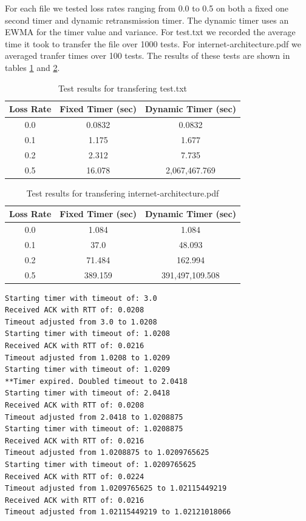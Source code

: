 \documentclass[11pt]{article}
\begin{document}
For each file we tested loss rates ranging from 0.0 to 0.5 on both a fixed one second timer and dynamic retransmission timer. The dynamic timer uses an EWMA for the timer value and variance. For test.txt we recorded the average time it took to transfer the file over 1000 tests. For internet-architecture.pdf we averaged tranfer times over 100 tests. The results of these tests are shown in tables \ref{tbltest} and \ref{tblinternet}.

\begin{table}[H]
\begin{center}
\caption{Test results for transfering test.txt}
\label{tbltest}
\begin{tabular}{ccc}
  \toprule
  Loss Rate & Fixed Timer (sec) & Dynamic Timer (sec) \\
  \midrule
  0.0 & 0.0832 & 0.0832 \\
  0.1 & 1.175 & 1.677 \\
  0.2 & 2.312 & 7.735 \\
  0.5 & 16.078 & 2,067,467.769 \\
  \bottomrule
\end{tabular}
\end{center}
\end{table}

\begin{table}[H]
\begin{center}
\caption{Test results for transfering internet-architecture.pdf}
\label{tblinternet}
\begin{tabular}{ccc}
  \toprule
  Loss Rate & Fixed Timer (sec) & Dynamic Timer (sec) \\
  \midrule
  0.0 & 1.084 & 1.084 \\
  0.1 & 37.0 & 48.093 \\
  0.2 & 71.484 & 162.994 \\
  0.5 & 389.159 & 391,497,109.508 \\
  \bottomrule
\end{tabular}
\end{center}
\end{table}

\begin{lstlisting}[caption={Dynamic retransmission output},label=retransOutput]
Starting timer with timeout of: 3.0
Received ACK with RTT of: 0.0208
Timeout adjusted from 3.0 to 1.0208
Starting timer with timeout of: 1.0208
Received ACK with RTT of: 0.0216
Timeout adjusted from 1.0208 to 1.0209
Starting timer with timeout of: 1.0209
**Timer expired. Doubled timeout to 2.0418
Starting timer with timeout of: 2.0418
Received ACK with RTT of: 0.0208
Timeout adjusted from 2.0418 to 1.0208875
Starting timer with timeout of: 1.0208875
Received ACK with RTT of: 0.0216
Timeout adjusted from 1.0208875 to 1.0209765625
Starting timer with timeout of: 1.0209765625
Received ACK with RTT of: 0.0224
Timeout adjusted from 1.0209765625 to 1.02115449219
Received ACK with RTT of: 0.0216
Timeout adjusted from 1.02115449219 to 1.02121018066
\end{lstlisting}
\end{document}
